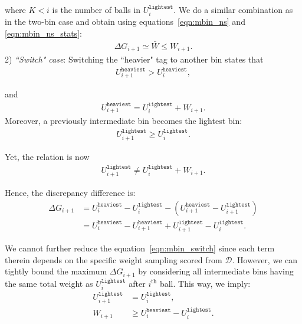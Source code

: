 \documentclass[12pt,psfig,a4]{article}
\theoremstyle{plain}
\begin{document}
where $K<i$ is the number of balls in $U_{i}^{\texttt{lightest}}$. We do a similar combination as in the two-bin case and obtain using equations~\ref{eqn:mbin_ns} and \ref{eqn:mbin_ns_stats}: \\
\begin{align}
	\Delta G_{i+1}\simeq \bar{W} \leq W_{i+1}.
	\label{eqn:mbin_switch3}
\end{align}
2) \textit{``Switch" case}: Switching the ``heavier" tag to another bin states that 
\begin{align}
	\nonumber 
	U_{i+1}^{\texttt{heaviest}}>U_{i}^{\texttt{heaviest}} ,
\end{align}

and 
\begin{align}
	U_{i+1}^{\texttt{heaviest}}=U_{i}^{\texttt{lightest}}+W_{i+1}. 
	\label{mbin_switch_ui1}
\end{align}
Moreover, a previously intermediate bin becomes the lightest bin:  
\begin{align}
	\nonumber
	U_{i+1}^{\texttt{lightest}} \geq U_{i}^{\texttt{lightest}}.
\end{align} 

Yet, the relation is now
\begin{align}
	\nonumber
	U_{i+1}^{\texttt{lightest}}\neq U_{i}^{\texttt{lightest}}+W_{i+1}.
\end{align} 

Hence, the discrepancy difference is: 
\begin{align}
\nonumber
	\Delta G_{i+1}&=  U_{i}^{\texttt{heaviest}} - U_{i}^{\texttt{lightest}} - ( U_{i+1}^{\texttt{heaviest}} - U_{i+1}^{\texttt{lightest}} )  \\
	&= U_{i}^{\texttt{heaviest}} - U_{i+1}^{\texttt{heaviest}}  + U_{i+1}^{\texttt{lightest}} - U_{i}^{\texttt{lightest}} .
	\label{eqn:mbin_switch}
\end{align}

We cannot further reduce the equation~\ref{eqn:mbin_switch} since each term therein depends on the specific weight sampling scored from $\mathcal{D}$. However, we can tightly bound the maximum $\Delta G_{i+1}$ by considering all intermediate bins having the same total weight as $U_{i}^{\texttt{lightest}}$ after $i^{\text{th}}$ ball. This way, we imply:
\begin{align}
	U_{i+1}^{\texttt{lightest}}&=U_{i}^{\texttt{lightest}} , \label{mbin_switch_ui2} \\	
	W_{i+1}&\geq U_{i}^{\texttt{heaviest}} - U_{i}^{\texttt{lightest}} .
	\label{mbin_switch_wi1}
\end{align} 
\end{document}

